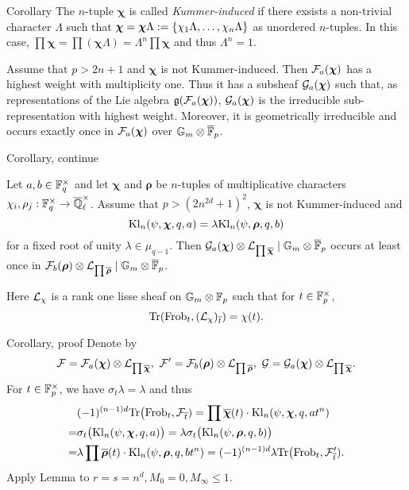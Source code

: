 \documentclass[aspectratio=169,handout]{beamer}
\newcommand\bchi{{\boldsymbol\chi}}
\newcommand\brho{{\boldsymbol\rho}}
\begin{document}
\begin{frame}{Corollary}
The $n$-tuple $\bchi$ is called {\em Kummer-induced} if there exsists a non-trivial character $\Lambda$ such that $\bchi=\bchi\Lambda:=\set{\chi_1\Lambda,\dots,\chi_n\Lambda}$ as unordered $n$-tuples.
In this case, $\prod\bchi=\prod(\bchi\Lambda)=\Lambda^n\prod\bchi$ and thus $\Lambda^n=1$. \pause

Assume that $p>2n+1$ and $\bchi$ is not Kummer-induced. \pause
Then $\CF_a(\bchi)$ has a highest weight with multiplicity one.  \pause
Thus it has a subsheaf $\CG_a(\bchi)$ such that, as representations of the Lie algebra $\fg(\CF_a(\bchi))$, $\CG_a(\bchi)$ is the irreducible sub-representation with highest weight. \pause
Moreover, it is geometrically irreducible and occurs exactly once in $\CF_a(\bchi)$ over $\mathbb{G}_m\otimes\overline{{\mathbb{F}}}_p$.

\end{frame}


\begin{frame}{Corollary, continue}
\begin{corollary}
Let $a,b\in{\mathbb{F}}_q^\times$ and let $\bchi$ and $\brho$ be $n$-tuples of multiplicative characters $\chi_i,\rho_j:{\mathbb{F}}_q^\times\to\overline{{\mathbb{Q}}}_\ell^\times$.
Assume that $p>(2n^{2d}+1)^2$, $\bchi$ is not Kummer-induced	and 
	\[\Kl_n(\psi,\bchi,q,a)=\lambda\Kl_n(\psi,\brho,q,b)\]
for a fixed root of unity $\lambda\in\mu_{q-1}$.
Then $\CG_a(\bchi)\otimes \CL_{\prod \ov\bchi}\mid \Gm\otimes\ov \BF_p$ occurs at least once in $\CF_b(\brho)\otimes\CL_{\prod\ov \brho}\mid \Gm\otimes\ov \BF_p$.
\end{corollary}

Here ${\mathcal{L}}_\chi$ is a rank one lisse sheaf on $\mathbb{G}_m\otimes{\mathbb{F}}_p$ such that for $t\in{\mathbb{F}}_p^\times$,
	\[{\mathrm{Tr}}({\mathrm{Frob}}_t,({\mathcal{L}}_\chi)_{\overline t})=\chi(t).\]

\end{frame}


\begin{frame}{Corollary, proof}
Denote by
	\[\CF=\CF_a(\bchi)\otimes\CL_{\prod\ov \bchi},\	\CF'=\CF_b(\brho)\otimes\CL_{\prod\ov\brho},\ \CG=\CG_a(\bchi)\otimes\CL_{\prod\ov\bchi}.\]
For $t\in{\mathbb{F}}_p^\times$, we have $\sigma_t\lambda=\lambda$ and thus
\[\begin{split}
&(-1)^{(n-1)d}\Tr\bigl(\Frob_t, \CF_{\ov t})
=\prod\ov\bchi(t)\cdot\Kl_n(\psi,\bchi,q,at^n)\\
=&\sigma_t\bigl(\Kl_n(\psi,\bchi,q,a)\bigr)
=\lambda\sigma_t\bigl(\Kl_n(\psi,\brho,q,b)\bigr)\\
=&\lambda\prod\ov\brho(t)\cdot\Kl_n(\psi,\brho,q,bt^n)
=(-1)^{(n-1)d}\lambda\Tr\bigl(\Frob_t, \CF'_{\ov t}).
\end{split}\]
Apply Lemma to $r=s=n^d,M_0=0,M_\infty\le 1$.

\end{frame}
\end{document}
